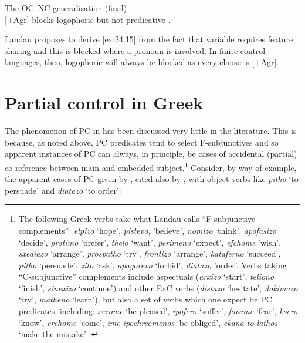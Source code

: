 \documentclass[output=paper]{langsci/langscibook}
\begin{document}
\ea\label{ex:24.15} The \gls{OC}--NC generalisation (final)\\
    {}[+Agr] blocks logophoric  but not predicative .
\z

Landau proposes to derive \eqref{ex:24.15} from the fact that variable  requires
feature sharing and this is blocked where a pronoun is involved. In finite
control languages, then, logophoric  will always be blocked as every
clause is [+Agr].

\section{Partial control in Greek}\label{sec:24.3}

The phenomenon of \gls{PC} in  has been
discussed very little in the literature. This is because, as noted above,
\gls{PC} predicates tend to select F-subjunctives
and so apparent instances of \gls{PC} can always, in
principle, be cases of accidental (partial) co-reference between main and
embedded subject.\footnote{The following Greek verbs take what Landau calls
    \enquote{F-subjunctive complements}: \emph{elpizo} `hope',
    \emph{pistevo}, 'believe', \emph{nomizo} `think', \emph{apofasizo}
    `decide', \emph{protimo} 'prefer', \emph{thelo} `want', \emph{perimeno}
    `expect', \emph{efchome} 'wish', \emph{sxediazo} `arrange',
    \emph{prospatho} `try', \emph{frontizo} `arrange', \emph{kataferno}
    `succeed', \emph{pitho} `persuade', \emph{zito} `ask', \emph{apagorevo}
    `forbid', \emph{diatazo} 'order'. Verbs taking \enquote{C-subjunctive}
    complements include aspectuals (\emph{arxizo} `start', \emph{teliono}
    `finish', \emph{sinexizo} `continue') and other
    \gls{ExC} verbs (\emph{distazo} `hesitate',
    \emph{dokimazo} `try', \emph{matheno} `learn'), but also a set of verbs
    which one expect be \gls{PC} predicates,
    including: \emph{xerome} `be pleased', \emph{ipofero} `suffer',
    \emph{fovame} `fear', \emph{ksero} `know', \emph{erchome} `come', \emph{ime
ipochreomenos} `be obliged', \emph{ekana to lathos} `make the mistake'
\parencite[Ch.\ 4]{Varlokosta1994}.\label{fn:24.4}} Consider, by way of
example, the apparent cases of \gls{PC} given by
\textcite{Spyropoulos2007b}, cited also by \textcite{Kapetangianni2010}, with
object  verbs like \emph{pitho} `to persuade' and \emph{diatazo} `to
order':
\end{document}
